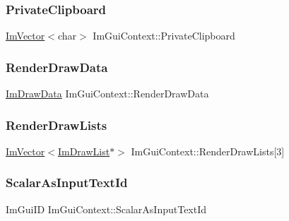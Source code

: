 \subsubsection{\texorpdfstring{Private\+Clipboard}{PrivateClipboard}}
{\footnotesize\ttfamily \hyperlink{class_im_vector}{Im\+Vector}$<$char$>$ Im\+Gui\+Context\+::\+Private\+Clipboard}

\hypertarget{struct_im_gui_context_a81cacf53454e6dc932a7e3181179a3af}{}\label{struct_im_gui_context_a81cacf53454e6dc932a7e3181179a3af} 
\subsubsection{\texorpdfstring{Render\+Draw\+Data}{RenderDrawData}}
{\footnotesize\ttfamily \hyperlink{struct_im_draw_data}{Im\+Draw\+Data} Im\+Gui\+Context\+::\+Render\+Draw\+Data}

\hypertarget{struct_im_gui_context_a65c7d5bafc5cb52d77d181925ff777da}{}\label{struct_im_gui_context_a65c7d5bafc5cb52d77d181925ff777da} 
\subsubsection{\texorpdfstring{Render\+Draw\+Lists}{RenderDrawLists}}
{\footnotesize\ttfamily \hyperlink{class_im_vector}{Im\+Vector}$<$\hyperlink{struct_im_draw_list}{Im\+Draw\+List}$\ast$$>$ Im\+Gui\+Context\+::\+Render\+Draw\+Lists\mbox{[}3\mbox{]}}

\hypertarget{struct_im_gui_context_af7d6712f53762d620c4d4dac89dbc222}{}\label{struct_im_gui_context_af7d6712f53762d620c4d4dac89dbc222} 
\subsubsection{\texorpdfstring{Scalar\+As\+Input\+Text\+Id}{ScalarAsInputTextId}}
{\footnotesize\ttfamily Im\+Gui\+ID Im\+Gui\+Context\+::\+Scalar\+As\+Input\+Text\+Id}

\hypertarget{struct_im_gui_context_a07456ba31300e2ee1cb1827dfbd02fe6}{}\label{struct_im_gui_context_a07456ba31300e2ee1cb1827dfbd02fe6} 
